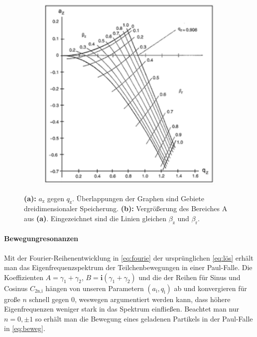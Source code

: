 \documentclass[numbers=noenddot,a4paper,notitlepage,twoside,BCOR15mm]{scrartcl}
\newcommand{\ix}[1]{_\text{#1}}
\newcommand{\imag}{\mathbf{i}}
\newcommand{\fett}[1]{\textbf{#1}}
\begin{document}
\begin{figure}[t]
\begin{subfigure}[t]{0.37\textwidth}
					\includegraphics[width=\textwidth]{stab_2.png}
					\caption{}\label{img:stab2}
				\end{subfigure}
				\caption{\fett{(a):} $a\ix{z}$ gegen $q\ix{z}$. Überlappungen der Graphen sind Gebiete dreidimensionaler Speicherung. \fett{(b):} Vergrößerung des Bereiches A aus \fett{(a)}. Eingezeichnet sind die Linien gleichen $\beta\ix{z}$ und $\beta\ix{r}$. }\label{img:stab}
			\end{figure}


			\paragraph{Bewegungresonanzen}

				Mit der Fourier-Reihenentwicklung in \autoref{eq:fourie} der ursprünglichen \autoref{eq:lös} erhält man das Eigenfrequenzspektrum der Teilchenbewegungen in einer Paul-Falle. Die Koeffizienten $A=\gamma\ix{1}+\gamma\ix{2}$, $B=\imag(\gamma\ix{1}+\gamma\ix{2})$ und die der Reihen für Sinus und Cosinus $C\ix{2n,i}$ hängen von unseren Parametern $(a\ix{i},q\ix{i})$ ab und konvergieren für große $n$ schnell gegen 0, weswegen argumentiert werden kann, dass höhere Eigenfrequenzen weniger stark in das Spektrum einfließen. Beachtet man nur $n=0,\pm1$ so erhält man die Bewegung eines geladenen Partikels in der Paul-Falle in \autoref{eq:beweg}.
\end{document}
